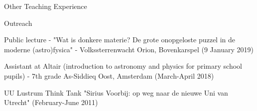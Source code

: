 \begin{rSection}{Other Teaching Experience}
\begin{rSubsection}{Outreach}{}{}{}
  \vspace{-1.5em}
  \item Public lecture - "Wat is donkere materie? De grote onopgeloste puzzel in de moderne (astro)fysica" - Volkssterrenwacht Orion, Bovenkarspel (9 January 2019)
  \item Assistant at Altair (introduction to astronomy and physics for primary school pupils) - 7th grade As-Siddieq Oost, Amsterdam (March-April 2018)
  \item UU Lustrum Think Tank "Sirius Voorbij: op weg naar de nieuwe Uni van Utrecht" (February-June 2011)
\end{rSubsection}

\end{rSection}


